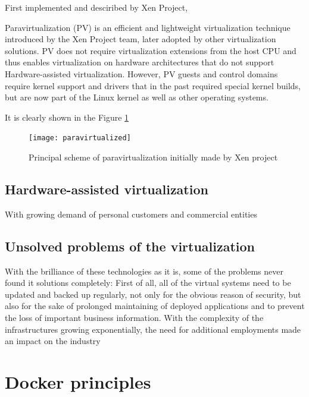 First implemented and desciribed by Xen Project,

\begin{definition}
Paravirtualization (PV) is an efficient and lightweight virtualization technique
introduced by the Xen Project team, later adopted by other
virtualization solutions. PV does not require virtualization extensions from
the host CPU and thus enables virtualization on hardware architectures that do
not support Hardware-assisted virtualization.
However, PV guests and control domains require kernel
support and drivers that in the past required special kernel builds,
but are now part of the Linux kernel as well as other
operating systems.\cite{ParavirtualizationDefinition}
\end{definition}

It is clearly shown in the Figure \ref{fig:ParavirtualizationPic}
\begin{figure}
\texttt{[image: paravirtualized]}
\caption{Principal scheme of paravirtualization initially made by Xen project}
\cite{ParavirtualizationPic}
\label{fig:ParavirtualizationPic}
\end{figure}

\subsection{Hardware-assisted virtualization}

With growing demand of personal customers and commercial entities

\subsection{Unsolved problems of the virtualization}

With the brilliance of these technologies as it is,
some of the problems never found it solutions completely:
First of all, all of the virtual systems
need to be updated and backed up regularly,
not only for the obvious reason of security,
but also for the sake of prolonged maintaining of deployed applications and to
prevent the loss of important business information.
With the complexity of the infrastructures
growing exponentially, the need for additional
employments made an impact on the industry \cite{VirtualizationProblems}

\section{Docker principles}

